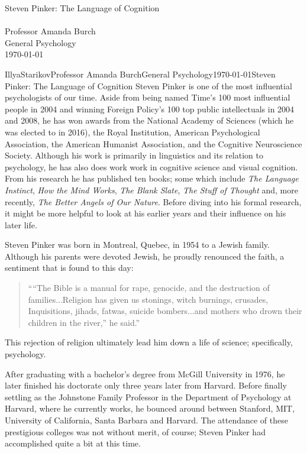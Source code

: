 \documentclass[12pt,letterpaper]{article}
\newenvironment{mlatitlepage}[5]{\linespread{1}\small\normalsize\vspace*{3in} \centering #5 \\ \vspace{4in} \centering {#1} \\ #2 \\ #3 \\ #4}{\newpage}
\begin{document}
\begin{mlatitlepage}{Illya Starikov}{Professor Amanda Burch}{General Psychology}{\today}{Steven Pinker: The Language of Cognition}
\end{mlatitlepage}

\begin{mla}{Illya}{Starikov}{Professor Amanda Burch}{General Psychology}{\today}{Steven Pinker: The Language of Cognition}
Steven Pinker is one of the most influential psychologists of our time. Aside from being named Time's 100 most influential people in 2004 and winning Foreign Policy's 100 top public intellectuals in 2004 and 2008, he has won awards from the National Academy of Sciences (which he was elected to in 2016), the Royal Institution, American Psychological Association, the American Humanist Association, and the Cognitive Neuroscience Society. Although his work is primarily in linguistics and its relation to psychology, he has also does work work in cognitive science and visual cognition. From his research he has published ten books; some which include \textit{The Language Instinct}, \textit{How the Mind Works}, \textit{The Blank Slate}, \textit{The Stuff of Thought} and, more recently, \textit{The Better Angels of Our Nature}. Before diving into his formal research, it might be more helpful to look at his earlier years and their influence on his later life.

Steven Pinker was born in Montreal, Quebec, in 1954 to a Jewish family. Although his parents were devoted Jewish, he proudly renounced the faith, a sentiment that is found to this day:

\begin{quotation}
``“The Bible is a manual for rape, genocide, and the destruction of families...Religion has given us stonings, witch burnings, crusades, Inquisitions, jihads, fatwas, suicide bombers...and mothers who drown their children in the river,” he said.''
\end{quotation}

\noindent This rejection of religion ultimately lead him down a life of science; specifically, psychology.

After graduating with a bachelor's degree from McGill University in 1976, he later finished his doctorate only three years later from Harvard. Before finally settling as the Johnstone Family Professor in the Department of Psychology at Harvard, where he currently works, he bounced around between Stanford, MIT, University of California, Santa Barbara and Harvard. The attendance of these prestigious colleges was not without merit, of course; Steven Pinker had accomplished quite a bit at this time.


\end{mla}
\end{document}

